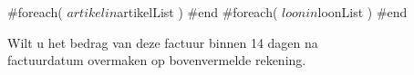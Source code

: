 \documentclass{factuur}
\begin{document}

\begin{particulierTable}[$Valuta]
	#foreach( $artikel in $artikelList )
	#end
	#foreach( $loon in $loonList )
	#end
\end{particulierTable}


\vfill
\begin{center}
	Wilt u het bedrag van deze factuur binnen 14 dagen na\\
	factuurdatum overmaken op bovenvermelde rekening.
\end{center}
\end{document}
